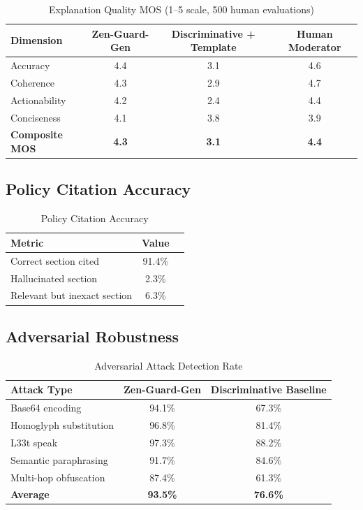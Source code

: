 \documentclass[11pt,a4paper]{article}
\begin{document}
\begin{table}[H]
\centering
\caption{Explanation Quality MOS (1--5 scale, 500 human evaluations)}
\begin{tabular}{lccc}
\toprule
\textbf{Dimension} & \textbf{Zen-Guard-Gen} & \textbf{Discriminative + Template} & \textbf{Human Moderator} \\
\midrule
Accuracy & 4.4 & 3.1 & 4.6 \\
Coherence & 4.3 & 2.9 & 4.7 \\
Actionability & 4.2 & 2.4 & 4.4 \\
Conciseness & 4.1 & 3.8 & 3.9 \\
\textbf{Composite MOS} & \textbf{4.3} & \textbf{3.1} & \textbf{4.4} \\
\bottomrule
\end{tabular}
\end{table}

\subsection{Policy Citation Accuracy}

\begin{table}[H]
\centering
\caption{Policy Citation Accuracy}
\begin{tabular}{lcc}
\toprule
\textbf{Metric} & \textbf{Value} \\
\midrule
Correct section cited & 91.4\% \\
Hallucinated section & 2.3\% \\
Relevant but inexact section & 6.3\% \\
\bottomrule
\end{tabular}
\end{table}

\subsection{Adversarial Robustness}

\begin{table}[H]
\centering
\caption{Adversarial Attack Detection Rate}
\begin{tabular}{lcc}
\toprule
\textbf{Attack Type} & \textbf{Zen-Guard-Gen} & \textbf{Discriminative Baseline} \\
\midrule
Base64 encoding & 94.1\% & 67.3\% \\
Homoglyph substitution & 96.8\% & 81.4\% \\
L33t speak & 97.3\% & 88.2\% \\
Semantic paraphrasing & 91.7\% & 84.6\% \\
Multi-hop obfuscation & 87.4\% & 61.3\% \\
\textbf{Average} & \textbf{93.5\%} & \textbf{76.6\%} \\
\bottomrule
\end{tabular}
\end{table}
\end{document}
